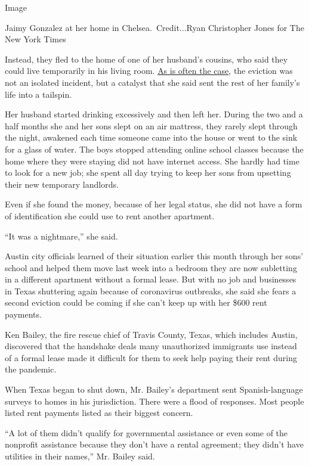 Image

Jaimy Gonzalez at her home in Chelsea.~Credit...Ryan Christopher Jones
for The New York Times

Instead, they fled to the home of one of her husband's cousins, who said
they could live temporarily in his living room.
\href{https://www.nytimes3xbfgragh.onion/2016/02/22/books/evicted-book-review-matthew-desmond.html}{As
is often the case}, the eviction was not an isolated incident, but a
catalyst that she said sent the rest of her family's life into a
tailspin.

Her husband started drinking excessively and then left her. During the
two and a half months she and her sons slept on an air mattress, they
rarely slept through the night, awakened each time someone came into the
house or went to the sink for a glass of water. The boys stopped
attending online school classes because the home where they were staying
did not have internet access. She hardly had time to look for a new job;
she spent all day trying to keep her sons from upsetting their new
temporary landlords.

Even if she found the money, because of her legal status, she did not
have a form of identification she could use to rent another apartment.

``It was a nightmare,'' she said.

Austin city officials learned of their situation earlier this month
through her sons' school and helped them move last week into a bedroom
they are now subletting in a different apartment without a formal lease.
But with no job and businesses in Texas shuttering again because of
coronavirus outbreaks, she said she fears a second eviction could be
coming if she can't keep up with her \$600 rent payments.

Ken Bailey, the fire rescue chief of Travis County, Texas, which
includes Austin, discovered that the handshake deals many unauthorized
immigrants use instead of a formal lease made it difficult for them to
seek help paying their rent during the pandemic.

When Texas began to shut down, Mr. Bailey's department sent
Spanish-language surveys to homes in his jurisdiction. There were a
flood of responses. Most people listed rent payments listed as their
biggest concern.

``A lot of them didn't qualify for governmental assistance or even some
of the nonprofit assistance because they don't have a rental agreement;
they didn't have utilities in their names,'' Mr. Bailey said.

